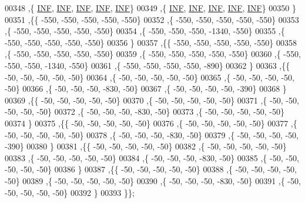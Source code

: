\begin{DoxyCode}
00348   ,\{   \mbox{\hyperlink{1_88_84__epars_8h_a12c2040f25d8e3a7b9e1c2024c618cb6}{INF}},   \mbox{\hyperlink{1_88_84__epars_8h_a12c2040f25d8e3a7b9e1c2024c618cb6}{INF}},   \mbox{\hyperlink{1_88_84__epars_8h_a12c2040f25d8e3a7b9e1c2024c618cb6}{INF}},   \mbox{\hyperlink{1_88_84__epars_8h_a12c2040f25d8e3a7b9e1c2024c618cb6}{INF}},   \mbox{\hyperlink{1_88_84__epars_8h_a12c2040f25d8e3a7b9e1c2024c618cb6}{INF}}\}
00349   ,\{   \mbox{\hyperlink{1_88_84__epars_8h_a12c2040f25d8e3a7b9e1c2024c618cb6}{INF}},   \mbox{\hyperlink{1_88_84__epars_8h_a12c2040f25d8e3a7b9e1c2024c618cb6}{INF}},   \mbox{\hyperlink{1_88_84__epars_8h_a12c2040f25d8e3a7b9e1c2024c618cb6}{INF}},   \mbox{\hyperlink{1_88_84__epars_8h_a12c2040f25d8e3a7b9e1c2024c618cb6}{INF}},   \mbox{\hyperlink{1_88_84__epars_8h_a12c2040f25d8e3a7b9e1c2024c618cb6}{INF}}\}
00350   \}
00351  ,\{\{  -550,  -550,  -550,  -550,  -550\}
00352   ,\{  -550,  -550,  -550,  -550,  -550\}
00353   ,\{  -550,  -550,  -550,  -550,  -550\}
00354   ,\{  -550,  -550,  -550, -1340,  -550\}
00355   ,\{  -550,  -550,  -550,  -550,  -550\}
00356   \}
00357  ,\{\{  -550,  -550,  -550,  -550,  -550\}
00358   ,\{  -550,  -550,  -550,  -550,  -550\}
00359   ,\{  -550,  -550,  -550,  -550,  -550\}
00360   ,\{  -550,  -550,  -550, -1340,  -550\}
00361   ,\{  -550,  -550,  -550,  -550,  -890\}
00362   \}
00363  ,\{\{   -50,   -50,   -50,   -50,   -50\}
00364   ,\{   -50,   -50,   -50,   -50,   -50\}
00365   ,\{   -50,   -50,   -50,   -50,   -50\}
00366   ,\{   -50,   -50,   -50,  -830,   -50\}
00367   ,\{   -50,   -50,   -50,   -50,  -390\}
00368   \}
00369  ,\{\{   -50,   -50,   -50,   -50,   -50\}
00370   ,\{   -50,   -50,   -50,   -50,   -50\}
00371   ,\{   -50,   -50,   -50,   -50,   -50\}
00372   ,\{   -50,   -50,   -50,  -830,   -50\}
00373   ,\{   -50,   -50,   -50,   -50,   -50\}
00374   \}
00375  ,\{\{   -50,   -50,   -50,   -50,   -50\}
00376   ,\{   -50,   -50,   -50,   -50,   -50\}
00377   ,\{   -50,   -50,   -50,   -50,   -50\}
00378   ,\{   -50,   -50,   -50,  -830,   -50\}
00379   ,\{   -50,   -50,   -50,   -50,  -390\}
00380   \}
00381  ,\{\{   -50,   -50,   -50,   -50,   -50\}
00382   ,\{   -50,   -50,   -50,   -50,   -50\}
00383   ,\{   -50,   -50,   -50,   -50,   -50\}
00384   ,\{   -50,   -50,   -50,  -830,   -50\}
00385   ,\{   -50,   -50,   -50,   -50,   -50\}
00386   \}
00387  ,\{\{   -50,   -50,   -50,   -50,   -50\}
00388   ,\{   -50,   -50,   -50,   -50,   -50\}
00389   ,\{   -50,   -50,   -50,   -50,   -50\}
00390   ,\{   -50,   -50,   -50,  -830,   -50\}
00391   ,\{   -50,   -50,   -50,   -50,   -50\}
00392   \}
00393  \}\};
\end{DoxyCode}
